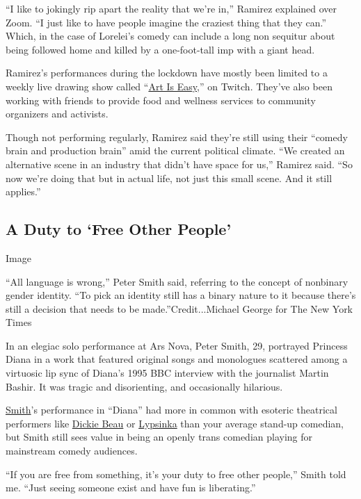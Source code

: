 ``I like to jokingly rip apart the reality that we're in,'' Ramirez
explained over Zoom. ``I just like to have people imagine the craziest
thing that they can.'' Which, in the case of Lorelei's comedy can
include a long non sequitur about being followed home and killed by a
one-foot-tall imp with a giant head.

Ramirez's performances during the lockdown have mostly been limited to a
weekly live drawing show called
``\href{https://www.twitch.tv/lramirez8095}{Art Is Easy},'' on Twitch.
They've also been working with friends to provide food and wellness
services to community organizers and activists.

Though not performing regularly, Ramirez said they're still using their
``comedy brain and production brain'' amid the current political
climate. ``We created an alternative scene in an industry that didn't
have space for us,'' Ramirez said. ``So now we're doing that but in
actual life, not just this small scene. And it still applies.''

\hypertarget{a-duty-to-free-other-people}{%
\subsection{A Duty to `Free Other
People'}\label{a-duty-to-free-other-people}}

Image

``All language is wrong,'' Peter Smith said, referring to the concept of
nonbinary gender identity. ``To pick an identity still has a binary
nature to it because there's still a decision that needs to be
made.''Credit...Michael George for The New York Times

In an elegiac solo performance at Ars Nova, Peter Smith, 29, portrayed
Princess Diana in a work that featured original songs and monologues
scattered among a virtuosic lip sync of Diana's 1995 BBC interview with
the journalist Martin Bashir. It was tragic and disorienting, and
occasionally hilarious.

\href{http://ptrsmth.com/}{Smith}'s performance in ``Diana'' had more in
common with esoteric theatrical performers like
\href{http://dickiebeau.com/}{Dickie Beau} or
\href{https://www.lypsinka.com/}{Lypsinka} than your average stand-up
comedian, but Smith still sees value in being an openly trans comedian
playing for mainstream comedy audiences.

``If you are free from something, it's your duty to free other people,''
Smith told me. ``Just seeing someone exist and have fun is liberating.''

